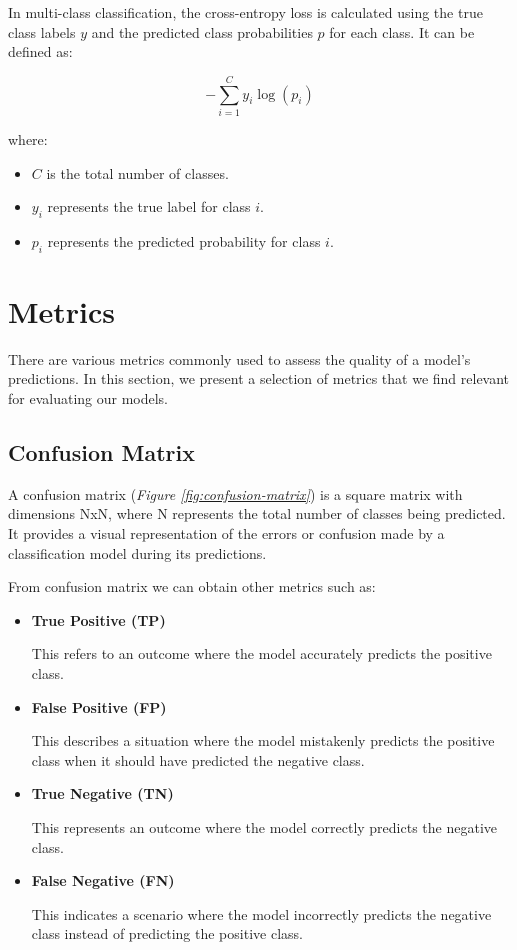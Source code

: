 In multi-class classification, the cross-entropy loss is calculated using the
true class labels \(y\) and the predicted class probabilities \(p\) for each
class. It can be defined as:

\[-\sum_{i=1}^{C} y_i \log(p_i)\]

\noindent where:

\begin{itemize}
  \item \(C\) is the total number of classes.
  \item \(y_i\) represents the true label for class \(i\).
  \item \(p_i\) represents the predicted probability for class \(i\).
\end{itemize}

\section{Metrics}
{\label{sec:metrics}}

There are various metrics commonly used to assess the quality of a model's predictions.
In this section, we present a selection of metrics that we find relevant for evaluating our models.

\subsection{Confusion Matrix}

A confusion matrix (\textit{Figure \ref{fig:confusion-matrix}}) is a square matrix with dimensions  NxN,
where  N represents the total number of classes being predicted.
It provides a visual representation of the errors or confusion made by a classification
model during its predictions. \newline

From confusion matrix we can obtain other metrics such as:

\begin{itemize}
  \item \textbf{True Positive (TP)}

    This refers to an outcome where the model accurately predicts the positive class.
  \item \textbf{False Positive (FP)}

    This describes a situation where the model mistakenly predicts the positive class when it should have predicted the negative class.
  \item \textbf{True Negative (TN)}

    This represents an outcome where the model correctly predicts the negative class.
  \item \textbf{False Negative (FN)}

    This indicates a scenario where the model incorrectly predicts the negative class instead of predicting the positive class.

\end{itemize}

